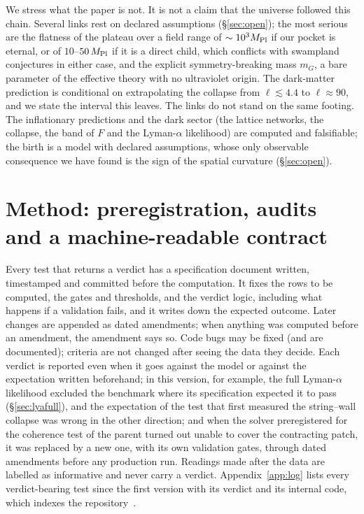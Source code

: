 \documentclass[11pt,a4paper]{article}
\newcommand{\Mpl}{M_{\rm Pl}}
\begin{document}
We stress what the paper is not.
It is not a claim that the universe followed this chain.
Several links rest on declared assumptions (\S\ref{sec:open}); the most serious are the flatness of the plateau over a field range of $\sim10^3\Mpl$ if our pocket is eternal, or of $10$--$50\,\Mpl$ if it is a direct child, which conflicts with swampland conjectures in either case, and the explicit symmetry-breaking mass $m_G$, a bare parameter of the effective theory with no ultraviolet origin.
The dark-matter prediction is conditional on extrapolating the collapse from $\ell\lesssim4.4$ to $\ell\approx90$, and we state the interval this leaves.
The links do not stand on the same footing. The inflationary predictions and the dark sector (the lattice networks, the collapse, the band of $F$ and the Lyman-$\alpha$ likelihood) are computed and falsifiable; the birth is a model with declared assumptions, whose only observable consequence we have found is the sign of the spatial curvature (\S\ref{sec:open}).

\section{Method: preregistration, audits and a machine-readable contract}
\label{sec:method}

Every test that returns a verdict has a specification document written, timestamped and committed before the computation.
It fixes the rows to be computed, the gates and thresholds, and the verdict logic, including what happens if a validation fails, and it writes down the expected outcome.
Later changes are appended as dated amendments; when anything was computed before an amendment, the amendment says so.
Code bugs may be fixed (and are documented); criteria are not changed after seeing the data they decide.
Each verdict is reported even when it goes against the model or against the expectation written beforehand; in this version, for example, the full Lyman-$\alpha$ likelihood excluded the benchmark where its specification expected it to pass (\S\ref{sec:lyafull}), and the expectation of the test that first measured the string--wall collapse was wrong in the other direction; and when the solver preregistered for the coherence test of the parent turned out unable to cover the contracting patch, it was replaced by a new one, with its own validation gates, through dated amendments before any production run.
Readings made after the data are labelled as informative and never carry a verdict.
Appendix~\ref{app:log} lists every verdict-bearing test since the first version with its verdict and its internal code, which indexes the repository~\cite{whalefall_chain}.
\end{document}
